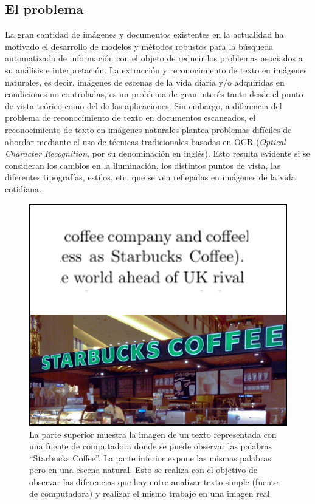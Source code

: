 \subsection{El problema}

	La gran cantidad de imágenes y documentos existentes en la actualidad ha motivado el desarrollo de modelos y métodos robustos para la búsqueda automatizada de información con el objeto de reducir los problemas asociados a su análisis e interpretación. La extracción y reconocimiento de texto en imágenes naturales, es decir, imágenes de escenas de la vida diaria y/o adquiridas en condiciones no controladas, es un problema de gran interés tanto desde el punto de vista teórico como del de las aplicaciones.  Sin embargo, a diferencia del problema de reconocimiento de texto en documentos escaneados, el reconocimiento de texto en imágenes naturales plantea problemas difíciles de abordar mediante el uso de técnicas tradicionales basadas en OCR (\textit{Optical Character Recognition}, por su denominación en inglés). Esto resulta evidente si se consideran los cambios en la iluminación, los distintos puntos de vista, las diferentes tipografías, estilos, etc. que se ven reflejadas en imágenes de la vida cotidiana.
	
			\begin{figure}[htbp]
				\centering
				\centerline{
					\includegraphics[scale=0.31]{img/ocr_vs_naturalImg_3.jpg}
				}
				\caption[OCRvsNaturales]{La parte superior muestra la imagen de un texto representada con una fuente de computadora donde se puede observar las palabras ``Starbucks Coffee''. La parte inferior expone las mismas palabras pero en una escena natural. Esto se realiza con el objetivo de observar las diferencias que hay entre analizar texto simple (fuente de computadora) y realizar el mismo trabajo en una imagen real}
				\label{fig: Optophone}
			\end{figure}
			
